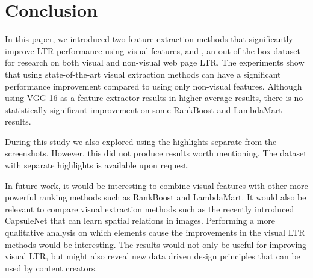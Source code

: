 
\section{Conclusion}
In this paper, we introduced two feature extraction methods that significantly improve \ac{LTR} performance using visual features, and \datasetname, an out-of-the-box dataset for research on both visual and non-visual web page \ac{LTR}.
The experiments show that using state-of-the-art visual extraction methods can have a significant performance improvement compared to using only non-visual features. Although using VGG-16 as a feature extractor results in higher average results, there is no statistically significant improvement on some RankBoost and LambdaMart results. 

 During this study we also explored using the highlights separate from the screenshots. However, this did not produce results worth mentioning. The dataset with separate highlights is available upon request. 
\fi

In future work, it would be interesting to combine visual features with other more powerful ranking methods such as RankBoost and LambdaMart. 
It would also be relevant to compare visual extraction methods such as the recently introduced CapsuleNet \cite{sabour2017dynamic} that can learn spatial relations in images.  
Performing a more qualitative analysis on which elements cause the improvements in the visual \ac{LTR} methods would be interesting. The results would not only be useful for improving visual \ac{LTR}, but might also reveal new data driven design principles that can be used by content creators. 